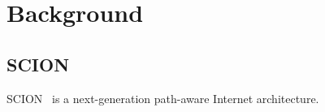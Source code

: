 \chapter{Background}
\label{ch:background}


\section{SCION}
\label{sec:background:scion}

SCION~\cite{Perrig2017} is a next-generation path-aware Internet architecture.
